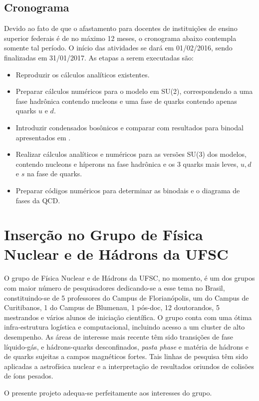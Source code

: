 \subsection{Cronograma}

Devido ao fato de que o afastamento para docentes de instituições de ensino superior federais é de no máximo 12 meses, o cronograma abaixo contempla somente tal período. O início das atividades se dará em 01/02/2016, sendo finalizadas em 31/01/2017. As etapas a serem executadas são:
\begin{itemize}
\item Reproduzir os cálculos analíticos existentes.
\item Preparar cálculos numéricos para o modelo em SU(2),
  correspondendo a uma fase hadrônica contendo nucleons e uma fase de
  quarks contendo apenas quarks $u$ e $d$.
\item Introduzir condensados bosônicos e comparar com resultados para
  binodal apresentados em \cite{Rafael}.
\item Realizar cálculos analíticos e numéricos para as versões SU(3)
  dos modelos, contendo nucleons e híperons na fase hadrônica e os 3
  quarks mais leves, $u,d$ e $s$ na fase de quarks.
\item Preparar códigos numéricos para determinar as binodais e o
  diagrama de fases da QCD. 
\end{itemize}

\section{Inserção no Grupo de Física Nuclear e de Hádrons da UFSC}

O grupo de Física Nuclear e de Hádrons da UFSC, no momento, é um dos grupos
com maior número de pesquisadores dedicando-se a esse tema no Brasil,
constituindo-se de 5 professores do Campus de Florianópolis, um do Campus de
Curitibanos, 1 do Campus de Blumenau, 1 pós-doc, 12 doutorandos, 5 mestrandos e vários alunos de
iniciação científica. O grupo conta com uma ótima infra-estrutura logística e
computacional, incluindo acesso a um cluster de alto desempenho. As áreas
de interesse mais recente têm sido transições de fase líquido-gás,
e hádrons-quarks desconfinados, {\it pasta phase} e matéria de hádrons e de
quarks sujeitas a campos magnéticos fortes. Tais linhas de pesquisa têm sido
aplicadas a astrofísica nuclear e a interpretação de resultados oriundos de
colisões de íons pesados.

O presente projeto adequa-se perfeitamente aos interesses do grupo.

